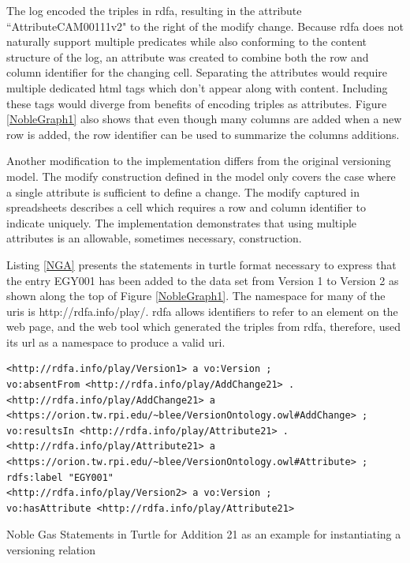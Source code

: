 The \gls{log} encoded the triples in \gls{rdfa}, resulting in the \gls{attribute} ``AttributeCAM00111v2" to the right of the \gls{modify} change.
Because \gls{rdfa} does not naturally support multiple predicates while also conforming to the content structure of the \gls{log}, an \gls{attribute} was created to combine both the row and column identifier for the changing cell.
Separating the \glspl{attribute} would require multiple dedicated \gls{html} tags which don't appear along with content.
Including these tags would diverge from benefits of encoding triples as \glspl{attribute}.
Figure \ref{NobleGraph1} also shows that even though many columns are added when a new row is added, the row identifier can be used to summarize the columns additions.

Another modification to the implementation differs from the original versioning model.
The \gls{modify} construction defined in the model only covers the case where a single \gls{attribute} is sufficient to define a \gls{change}.
The \gls{modify} captured in spreadsheets describes a cell which requires a row and column identifier to indicate uniquely.
The implementation demonstrates that using multiple \glspl{attribute} is an allowable, sometimes necessary, construction.

Listing \ref{NGA} presents the statements in turtle format necessary to express that the entry EGY001 has been added to the data set from Version 1 to Version 2 as shown along the top of Figure \ref{NobleGraph1}.
The namespace for many of the \glspl{uri} is \textlangle http://rdfa.info/play/\textrangle.
\gls{rdfa} allows identifiers to refer to an element on the web page, and the web tool which generated the triples from \gls{rdfa}, therefore, used its \gls{url} as a namespace to produce a valid \gls{uri}.

\begin{listing}
	\begin{verbatim}
<http://rdfa.info/play/Version1> a vo:Version ;
vo:absentFrom <http://rdfa.info/play/AddChange21> .
<http://rdfa.info/play/AddChange21> a <https://orion.tw.rpi.edu/~blee/VersionOntology.owl#AddChange> ;
vo:resultsIn <http://rdfa.info/play/Attribute21> .
<http://rdfa.info/play/Attribute21> a <https://orion.tw.rpi.edu/~blee/VersionOntology.owl#Attribute> ;
rdfs:label "EGY001"
<http://rdfa.info/play/Version2> a vo:Version ;
vo:hasAttribute <http://rdfa.info/play/Attribute21>
	\end{verbatim}
	\caption{Noble Gas Statements in Turtle for Addition 21 as an example for instantiating a versioning relation}
	\label{NGA}
\end{listing}


